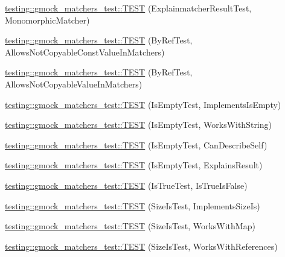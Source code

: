 \begin{DoxyCompactItemize}
\item 
\mbox{\hyperlink{namespacetesting_1_1gmock__matchers__test_a102b10d9064f6e0037e3f3f0c3e76e22}{testing\+::gmock\+\_\+matchers\+\_\+test\+::\+T\+E\+ST}} (Explainmatcher\+Result\+Test, Monomorphic\+Matcher)
\item 
\mbox{\hyperlink{namespacetesting_1_1gmock__matchers__test_aab82f120c70dc7d8bc2fd74ac6897486}{testing\+::gmock\+\_\+matchers\+\_\+test\+::\+T\+E\+ST}} (By\+Ref\+Test, Allows\+Not\+Copyable\+Const\+Value\+In\+Matchers)
\item 
\mbox{\hyperlink{namespacetesting_1_1gmock__matchers__test_a5ed7b822889a34f018c2ba8f21941fd4}{testing\+::gmock\+\_\+matchers\+\_\+test\+::\+T\+E\+ST}} (By\+Ref\+Test, Allows\+Not\+Copyable\+Value\+In\+Matchers)
\item 
\mbox{\hyperlink{namespacetesting_1_1gmock__matchers__test_ab63796f77c7572f6f1aef01cb140f99e}{testing\+::gmock\+\_\+matchers\+\_\+test\+::\+T\+E\+ST}} (Is\+Empty\+Test, Implements\+Is\+Empty)
\item 
\mbox{\hyperlink{namespacetesting_1_1gmock__matchers__test_a22f0cacccee169b7390741b9815f4281}{testing\+::gmock\+\_\+matchers\+\_\+test\+::\+T\+E\+ST}} (Is\+Empty\+Test, Works\+With\+String)
\item 
\mbox{\hyperlink{namespacetesting_1_1gmock__matchers__test_adcf3743190f973f2773296d0772e8950}{testing\+::gmock\+\_\+matchers\+\_\+test\+::\+T\+E\+ST}} (Is\+Empty\+Test, Can\+Describe\+Self)
\item 
\mbox{\hyperlink{namespacetesting_1_1gmock__matchers__test_a1c168c284000d05d63bf5e9df10d1b7c}{testing\+::gmock\+\_\+matchers\+\_\+test\+::\+T\+E\+ST}} (Is\+Empty\+Test, Explains\+Result)
\item 
\mbox{\hyperlink{namespacetesting_1_1gmock__matchers__test_a1cd170a421c94a8edf104b72ee1f396d}{testing\+::gmock\+\_\+matchers\+\_\+test\+::\+T\+E\+ST}} (Is\+True\+Test, Is\+True\+Is\+False)
\item 
\mbox{\hyperlink{namespacetesting_1_1gmock__matchers__test_abe619d5d1910e1f2e8b169622d1d8592}{testing\+::gmock\+\_\+matchers\+\_\+test\+::\+T\+E\+ST}} (Size\+Is\+Test, Implements\+Size\+Is)
\item 
\mbox{\hyperlink{namespacetesting_1_1gmock__matchers__test_aea77169d6c56b88b5c99273d5a2bc0f2}{testing\+::gmock\+\_\+matchers\+\_\+test\+::\+T\+E\+ST}} (Size\+Is\+Test, Works\+With\+Map)
\item 
\mbox{\hyperlink{namespacetesting_1_1gmock__matchers__test_a53bcd375786f69d889a8e8891ff8e0b0}{testing\+::gmock\+\_\+matchers\+\_\+test\+::\+T\+E\+ST}} (Size\+Is\+Test, Works\+With\+References)

\end{DoxyCompactItemize}
